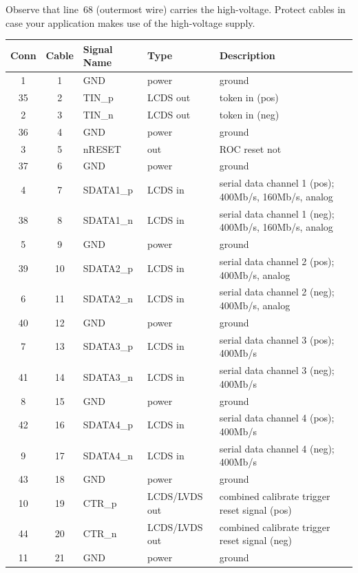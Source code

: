 Observe that line~68 (outermost wire) carries the high-voltage. Protect cables in case your application makes use of the high-voltage supply.

\begin{table}[p]
    \caption{Connector}
    {\tiny
	\begin{longtable}{cclll}
	    \toprule
	    \multicolumn{1}{l}{Conn} & \multicolumn{1}{l}{Cable} & Signal Name & Type & Description \\ 
	    \midrule
	    1 & 1 & GND & power & ground \\ 
	    35 & 2 & TIN\_p & LCDS out & token in (pos) \\ 
	    2 & 3 & TIN\_n & LCDS out & token in (neg) \\ 
	    36 & 4 & GND & power & ground \\ 
	    3 & 5 & nRESET & out & ROC reset not \\ 
	    37 & 6 & GND & power & ground \\ 
	    4 & 7 & SDATA1\_p & LCDS in & serial data channel 1 (pos); 400Mb/s, 160Mb/s, analog \\ 
	    38 & 8 & SDATA1\_n & LCDS in & serial data channel 1 (neg); 400Mb/s, 160Mb/s, analog \\ 
	    5 & 9 & GND & power & ground \\ 
	    39 & 10 & SDATA2\_p & LCDS in & serial data channel 2 (pos); 400Mb/s, analog \\ 
	    6 & 11 & SDATA2\_n & LCDS in & serial data channel 2 (neg); 400Mb/s, analog \\ 
	    40 & 12 & GND & power & ground \\ 
	    7 & 13 & SDATA3\_p & LCDS in & serial data channel 3 (pos); 400Mb/s \\ 
	    41 & 14 & SDATA3\_n & LCDS in & serial data channel 3 (neg); 400Mb/s \\ 
	    8 & 15 & GND & power & ground \\ 
	    42 & 16 & SDATA4\_p & LCDS in & serial data channel 4 (pos); 400Mb/s \\ 
	    9 & 17 & SDATA4\_n & LCDS in & serial data channel 4 (neg); 400Mb/s \\ 
	    43 & 18 & GND & power & ground \\ 
	    10 & 19 & CTR\_p & LCDS/LVDS out & combined calibrate trigger reset signal (pos) \\ 
	    44 & 20 & CTR\_n & LCDS/LVDS out & combined calibrate trigger reset signal (neg) \\ 
	    11 & 21 & GND & power & ground \\ 

\end{longtable}}
\end{table}
